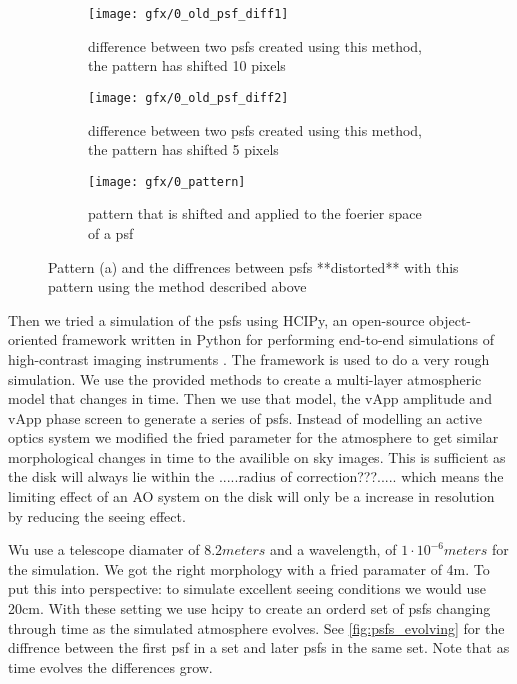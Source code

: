 \begin{figure}[h!]
      \begin{subfigure}[t]{0.5\textwidth}
        \texttt{[image: gfx/0\_old\_psf\_diff1]}
        \caption{difference between two psfs created using this method, the pattern has shifted 10 pixels}
      \end{subfigure}%
      \begin{subfigure}[t]{0.5\textwidth}
        \texttt{[image: gfx/0\_old\_psf\_diff2]}
        \caption{difference between two psfs created using this method, the pattern has shifted 5 pixels}
      \end{subfigure}
      
      \begin{subfigure}[]{0.5\textwidth}
        \texttt{[image: gfx/0\_pattern]}
        \caption{pattern that is shifted and applied to the foerier space of a psf}
      \end{subfigure}
      
  \caption{Pattern (a) and the diffrences between psfs **distorted** with this pattern using the method described above}
  \label{fig:patterns}
\end{figure}

Then we tried a simulation of the psfs using HCIPy, an open-source object-oriented framework written in Python for performing end-to-end simulations of high-contrast imaging instruments \cite{hcipy}. The framework is used to do a very rough simulation. We use the provided methods to create a multi-layer atmospheric model that changes in time. Then we use that model, the vApp amplitude and vApp phase screen to generate a series of psfs. Instead of modelling an active optics system we modified the fried parameter for the atmosphere to get similar morphological changes in time to the availible on sky images. This is sufficient as the disk will always lie within the .....radius of correction???..... which means the limiting effect of an AO system on the disk will only be a increase in resolution by reducing the seeing effect.

Wu use a telescope diamater of $8.2 meters$ and a wavelength, of $1\cdot 10^{-6} meters$ for the simulation. We got the right morphology with a fried paramater of 4m. To put this into perspective: to simulate excellent seeing conditions we would use 20cm. With these setting we use hcipy to create an orderd set of psfs changing through time as the simulated atmosphere evolves. See \autoref{fig:psfs_evolving} for the diffrence between the first psf in a set and later psfs in the same set. Note that as time evolves the differences grow. 

